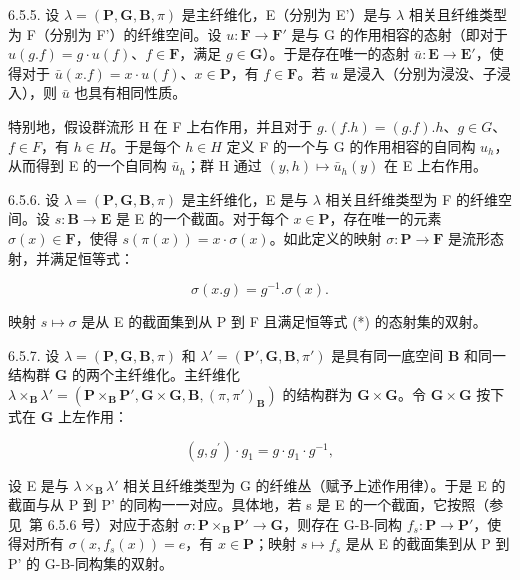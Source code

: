 6.5.5. 设 \(\lambda = (\mathbf{P}, \mathbf{G}, \mathbf{B}, \pi)\) 是主纤维化，E（分别为 E'）是与 \(\lambda\) 相关且纤维类型为 F（分别为 F'）的纤维空间。设 \(u: \mathbf{F} \to \mathbf{F}'\) 是与 G 的作用相容的态射（即对于 \(u(g.f) = g \cdot u(f)\)、\(f \in \mathbf{F}\)，满足 \(g \in \mathbf{G}\)）。于是存在唯一的态射 \(\bar{u}: \mathbf{E} \to \mathbf{E}'\)，使得对于 \(\bar{u}(x.f) = x \cdot u(f)\)、\(x \in \mathbf{P}\)，有 \(f \in \mathbf{F}\)。若 \(u\) 是浸入（分别为浸没、子浸入），则 \(\bar{u}\) 也具有相同性质。

特别地，假设群流形 H 在 F 上右作用，并且对于 \(g.(f.h) = (g.f).h\)、\(g \in G\)、\(f \in F\)，有 \(h \in H\)。于是每个 \(h \in H\) 定义 F 的一个与 G 的作用相容的自同构 \(u_h\)，从而得到 E 的一个自同构 \(\bar{u}_h\)；群 H 通过 \((y,h) \mapsto \bar{u}_h(y)\) 在 E 上右作用。

6.5.6. 设 \(\lambda = (\mathbf{P},\mathbf{G},\mathbf{B},\pi)\) 是主纤维化，E 是与 \(\lambda\) 相关且纤维类型为 F 的纤维空间。设 \(s: \mathbf{B} \to \mathbf{E}\) 是 E 的一个截面。对于每个 \(x \in \mathbf{P}\)，存在唯一的元素 \(\sigma(x) \in \mathbf{F}\)，使得 \(s(\pi(x)) = x \cdot \sigma(x)\)。如此定义的映射 \(\sigma: \mathbf{P} \to \mathbf{F}\) 是流形态射，并满足恒等式：

\[
\sigma (x. g) = g ^ {- 1}. \sigma (x).\tag{*}
\]

映射 \(s \mapsto \sigma\) 是从 E 的截面集到从 P 到 F 且满足恒等式 (*) 的态射集的双射。

6.5.7. 设 \(\lambda = (\mathbf{P}, \mathbf{G}, \mathbf{B}, \pi)\) 和 \(\lambda' = (\mathbf{P}', \mathbf{G}, \mathbf{B}, \pi')\) 是具有同一底空间 \(\mathbf{B}\) 和同一结构群 \(\mathbf{G}\) 的两个主纤维化。主纤维化 \(\lambda \times_{\mathbf{B}} \lambda' = (\mathbf{P} \times_{\mathbf{B}} \mathbf{P}', \mathbf{G} \times \mathbf{G}, \mathbf{B}, (\pi, \pi')_{\mathbf{B}})\) 的结构群为 \(\mathbf{G} \times \mathbf{G}\)。令 \(\mathbf{G} \times \mathbf{G}\) 按下式在 \(\mathbf{G}\) 上左作用：

\[
(g, g ^ {\prime}) \cdot g _ {1} = g \cdot g _ {1} \cdot g ^ {- 1},
\]

设 E 是与 \(\lambda \times_{\mathbf{B}} \lambda'\) 相关且纤维类型为 G 的纤维丛（赋予上述作用律）。于是 E 的截面与从 P 到 P' 的同构一一对应。具体地，若 s 是 E 的一个截面，它按照（参见~第 6.5.6 号）对应于态射 \(\sigma: \mathbf{P} \times_{\mathbf{B}} \mathbf{P}' \to \mathbf{G}\)，则存在 G-B-同构 \(f_s: \mathbf{P} \to \mathbf{P}'\)，使得对所有 \(\sigma(x, f_s(x)) = e\)，有 \(x \in \mathbf{P}\)；映射 \(s \mapsto f_s\) 是从 E 的截面集到从 P 到 P' 的 G-B-同构集的双射。

